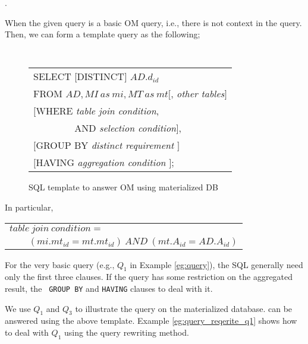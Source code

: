 .

When the given query is a basic OM query, i.e., there is not context
in the query.
Then, we can form a template query as the following;

\begin{figure}[htb]
{\tt
\begin{tabular}{l}
SELECT $[$DISTINCT$]$ $AD.d_{id}$\\
FROM $AD, MI~as~mi, MT~as~mt[$, {\em other tables}$]$\\
$[$WHERE    {\em table join condition}, \\
$\qquad\qquad$ AND {\em selection condition}$]$,\\
$[$GROUP BY {\em distinct requirement} $]$\\
$[$HAVING   {\em aggregation condition} $]$;
\end{tabular}
}
\caption{SQL template to answer OM using materialized DB}
\label{fig:sql_matdb_basic_omq}
\end{figure}

In particular,

\vspace{0.1in}
\begin{tabular}{l}
$table~join~condition=$\\
$\qquad (mi.mt_{id}=mt.mt_{id})~AND~(mt.A_{id}=AD.A_{id})$
\end{tabular}
\vspace{0.1in}

For the very basic query (e.g., $Q_1$ in Example \ref{eg:query}), the
SQL generally need only the first three clauses.
If the query has some restriction on the aggregated result, the {\tt
  GROUP BY} and {\tt HAVING} clauses to deal with it.

We use $Q_1$ and $Q_3$ to illustrate the query on the materialized
database.
can be answered using the above
template.
Example \ref{eg:query_reqerite_q1} shows how to deal with $Q_1$ using
the query rewriting method.

